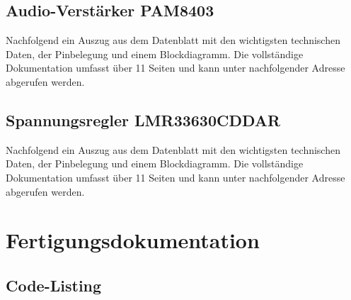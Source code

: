 \documentclass[a4paper, twoside, 12pt, openright]{memoir}
\begin{document}
\section{Audio-Verstärker PAM8403}
Nachfolgend ein Auszug aus dem Datenblatt mit den wichtigsten technischen Daten, der Pinbelegung und einem Blockdiagramm. Die vollständige Dokumentation umfasst über 11 Seiten und kann unter nachfolgender Adresse abgerufen werden.\par
{}

\section{Spannungsregler LMR33630CDDAR}
Nachfolgend ein Auszug aus dem Datenblatt mit den wichtigsten technischen Daten, der Pinbelegung und einem Blockdiagramm. Die vollständige Dokumentation umfasst über 11 Seiten und kann unter nachfolgender Adresse abgerufen werden.\par
{}

\chapter{Fertigungsdokumentation}
\section{Code-Listing}

\end{document}
